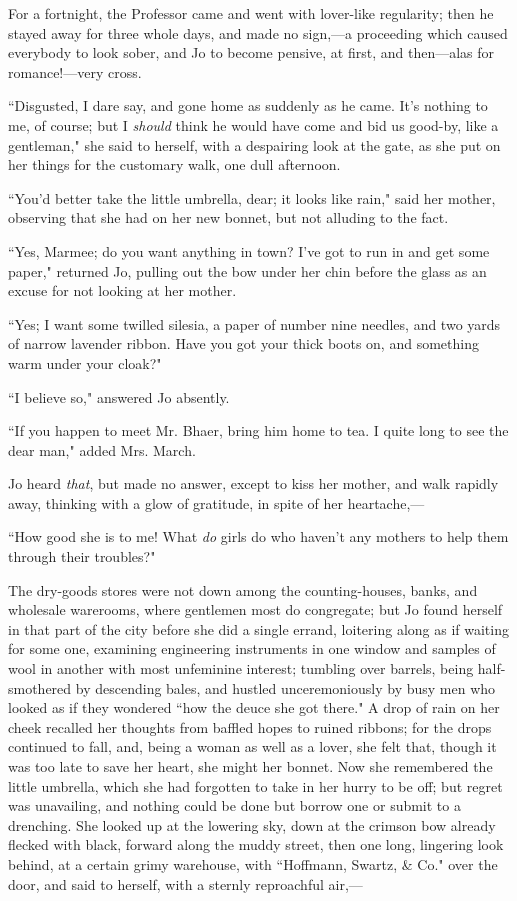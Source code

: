 For a fortnight, the Professor came and went with lover-like regularity;
then he stayed away for three whole days, and made no sign,---a
proceeding which caused everybody to look sober, and Jo to become
pensive, at first, and then---alas for romance!---very cross.

``Disgusted, I dare say, and gone home as suddenly as he came.
It's nothing to me, of course; but I \emph{should} think
he would have come and bid us good-by, like a gentleman," she said to
herself, with a despairing look at the gate, as she put on her things
for the customary walk, one dull afternoon.

``You'd better take the little umbrella, dear; it looks
like rain," said her mother, observing that she had on her new bonnet,
but not alluding to the fact.

``Yes, Marmee; do you want anything in town? I've got to
run in and get some paper," returned Jo, pulling out the bow under her
chin before the glass as an excuse for not looking at her mother.

``Yes; I want some twilled silesia, a paper of number nine needles, and
two yards of narrow lavender ribbon. Have you got your thick boots on,
and something warm under your cloak?"

``I believe so," answered Jo absently.

``If you happen to meet Mr. Bhaer, bring him home to tea. I quite long to
see the dear man," added Mrs. March.

Jo heard \emph{that}, but made no answer, except to kiss her mother, and
walk rapidly away, thinking with a glow of gratitude, in spite of her
heartache,---

``How good she is to me! What \emph{do} girls do who
haven't any mothers to help them through their
troubles?"

The dry-goods stores were not down among the counting-houses, banks, and
wholesale warerooms, where gentlemen most do congregate; but Jo found
herself in that part of the city before she did a single errand,
loitering along as if waiting for some one, examining engineering
instruments in one window and samples of wool in another with most
unfeminine interest; tumbling over barrels, being half-smothered by
descending bales, and hustled unceremoniously by busy men who looked as
if they wondered ``how the deuce she got there." A drop of rain on her
cheek recalled her thoughts from baffled hopes to ruined ribbons; for
the drops continued to fall, and, being a woman as well as a lover, she
felt that, though it was too late to save her heart, she might her
bonnet. Now she remembered the little umbrella, which she had forgotten
to take in her hurry to be off; but regret was unavailing, and nothing
could be done but borrow one or submit to a drenching. She looked up at
the lowering sky, down at the crimson bow already flecked with black,
forward along the muddy street, then one long, lingering look behind, at
a certain grimy warehouse, with ``Hoffmann, Swartz, \& Co." over the
door, and said to herself, with a sternly reproachful air,---

